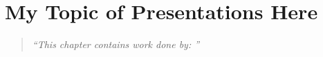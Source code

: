 \chapter{My Topic of Presentations Here}
\begin{quote}\it
``This chapter contains work done by: ''
\end{quote}